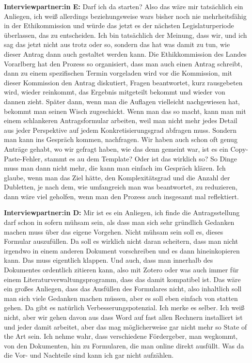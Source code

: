 \documentclass[a4paper,12pt,twoside]{scrreprt}
\begin{document}
\textbf{Interviewpartner:in E:} Darf ich da starten? Also das wäre mir tatsächlich ein Anliegen, ich weiß allerdings beziehungsweise wars bisher noch nie mehrheitsfähig in der Ethikommission und würde das jetzt es der nächsten Legislaturperiode überlassen, das zu entscheiden. Ich bin tatsächlich der Meinung, dass wir, und ich sag das jetzt nicht aus trotz oder so, sondern das hat was damit zu tun, wie dieser Antrag dann auch gestaltet werden kann. Die Ethikkommission des Landes Vorarlberg hat den Prozess so organisiert, dass man auch einen Antrag schreibt, dann zu einem spezifischen Termin vorgeladen wird vor die Kommission, mit dieser Kommission den Antrag diskutiert, Fragen beantwortet, kurz rausgebeten wird, wieder reinkommt, das Ergebnis mitgeteilt bekommt und wieder von dannen zieht. Später dann, wenn man die Auflagen vielleicht nachgewiesen hat, bekommt man seinen Wisch zugeschickt. Wenn man das so macht, kann man mit einem schlankeren Antragsformular arbeiten, weil man nicht mehr jedes Detail aus jeder Perspektive auf jedem Konkretisierungsgrad abfragen muss. Sondern man kann ins Gespräch kommen, nachfragen. Wir haben auch schon oft genug Anträge gehabt, wo wir gefragt haben, wie das denn gemeint war, ist es ein Copy-Paste-Fehler, stammt es au dem Template? Oder ist das wirklich so? So Dinge muss man dann nicht mehr, die kann man einfach im Gespräch klären. Ich glaube, wenn man das Ziel hätte, den Komplexitätsgrad und die Anzahl der Dubletten, je nach dem, wie umfangreich man was beantwortet, zu reduzieren, dann wäre viel geholfen, wenn man den Prozess auch insgesamt mal reflektiert.

\textbf{Interviewpartner:in D:} Mir ist es ein Anliegen, ich finde die Antragsstellung darf schon in sofern mühsam sein, als dass man sich sehr gründlich Gedanken machen muss über das eigene Vorgehen. Nicht mühsam sein soll es, dieses Formular auszufüllen. Da soll es wirklich nicht daran scheitern, dass man nicht irgendwo in einem anderen Dokument vorschreiben und es dann hineinkopieren kann. Das muss eigentlich klappen. Und auch, dass man innerhalb des Dokumentes ordentlich zitieren kann, also mit Zotero oder  was auch immer für einem Literaturverwaltungsprogramm, dass das damit kompatibel ist. Das wäre ein großes Anliegen, dass das Ausfüllen des Formulares nicht, also inhaltlich soll man sich viele Gedanken machen müssen, aber es soll eben einfach von statten gehen. Da gibt es natürlich Verbesserungspotenzial. Ich merke es selber. Ich weiß nicht, aber wir gehen davon aus dass Word auf fast allen Rechnern installiert ist und jeder damit arbeitet, aber das mag möglicherweise gar nicht mehr so State of the Art sein. Ich nehme wahr, dass verschiedene Fördergeber, man wegkommt, von den Dokumenten, hin zu Formularen, die man online direkt ausfüllt. Was da die Vor- und Nachteile sind kann ich gar nicht aufzählen.
\end{document}
